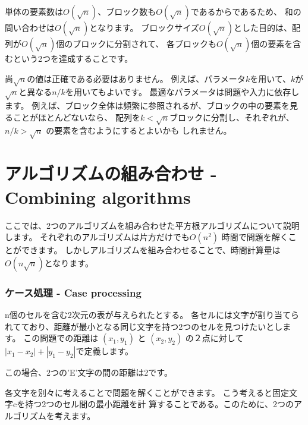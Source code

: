 単体の要素数は$O(\sqrt n)$、ブロック数も$O(\sqrt n)$であるからであるため、
和の問い合わせは$O(\sqrt n)$となります。
ブロックサイズ$O(\sqrt n)$とした目的は、配列が$O(\sqrt n)$個のブロックに分割されて、
各ブロックも$O(\sqrt n)$個の要素を含むという2つを達成することです。

尚$\sqrt n$の値は正確である必要はありません。
例えば、パラメータ$k$を用いて、$k$が$\sqrt n$と異なる$n/k$を用いてもよいです。
最適なパラメータは問題や入力に依存します。
例えば、ブロック全体は頻繁に参照されるが、ブロックの中の要素を見ることがほとんどないなら、
配列を$k < \sqrt n$ブロックに分割し、それぞれが、$n/k > \sqrt n$ の要素を含むようにするとよいかも しれません。

\section{アルゴリズムの組み合わせ - Combining algorithms}

ここでは、2つのアルゴリズムを組み合わせた平方根アルゴリズムについて説明します。
それぞれのアルゴリズムは片方だけでも$O(n^2)$ 時間で問題を解くことができます。
しかしアルゴリズムを組み合わせることで、時間計算量は$O(n \sqrt n)$となります。

\subsubsection{ケース処理 - Case processing}

n個のセルを含む2次元の表が与えられたとする。
各セルには文字が割り当てられてており、距離が最小となる同じ文字を持つ2つのセルを見つけたいとします。
この問題での距離は
$(x_1,y_1)$ と $(x_2,y_2)$ の２点に対して $|x_1-x_2|+|y_1-y_2|$で定義します。

\begin{center}
\end{center}
この場合、2つの'E'文字の間の距離は2です。

各文字を別々に考えることで問題を解くことができます。
こう考えると固定文字cを持つ2つのセル間の最小距離を計 算することである。このために、2つのアルゴリズムを考えます。

